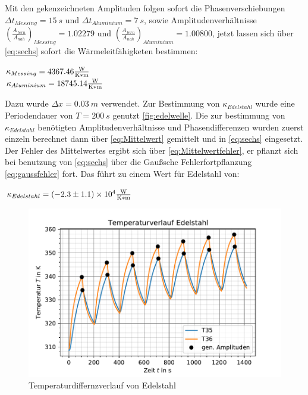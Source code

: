   Mit den gekenzeichneten Amplituden folgen sofort die Phasenverschiebungen $\Delta t_{Messing}=\SI[]{15}[]{s}$ 
  und $\Delta t_{Aluminium}=\SI[]{7}[]{s}$, sowie Amplitudenverhältnisse $(\frac{A_{fern}}{A_{nah}})_{Messing}=1.02279$ und $(\frac{A_{fern}}{A_{nah}})_{Aluminium}=1.00800$,
  jetzt lassen sich über \autoref{eq:sechs} sofort die Wärmeleitfähigketen bestimmen:
  \begin{center}
      $\kappa_{Messing}=4367.46\si[]{\frac{W}{K*m}}$\\
      $\kappa_{Aluminium}=18745.14\si[]{\frac{W}{K*m}}$
  \end{center}
  Dazu wurde $\Delta x=\SI[]{0.03}[]{m}$ verwendet.
  Zur Bestimmung von $\kappa_{Edelstahl}$ wurde eine Periodendauer von $T=\SI[]{200}[]{s}$ genutzt \autoref{fig:edelwelle}.
  Die zur bestimmung von $\kappa_{Edelstahl}$ benötigten Amplitudenverhältnisse und Phasendifferenzen
  wurden zuerst einzeln berechnet dann über \autoref{eq:Mittelwert} gemittelt und in \autoref{eq:sechs}
  eingesetzt. Der Fehler des Mittelwertes ergibt sich über \autoref{eq:Mittelwertfehler}, er pflanzt sich bei benutzung
  von \autoref{eq:sechs} über die Gaußsche Fehlerfortpflanzung \autoref{eq:gaussfehler} fort. 
  Das führt zu einem Wert für Edelstahl von:
  \begin{center}
      $\kappa_{Edelstahl}=(-2.3\pm 1.1)\times 10^{4}\si[]{\frac{W}{K*m}}$
  \end{center}
  \begin{figure}
    \centering
    \includegraphics{welleedelstahl.pdf}
    \caption{Temperaturdiffernzverlauf von Edelstahl}
    \label{fig:edelwelle}
  \end{figure}

